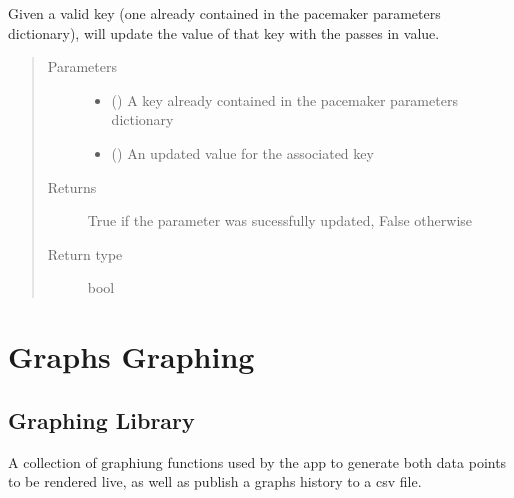 \documentclass[letterpaper,10pt,english]{sphinxmanual}
\begin{document}
\begin{fulllineitems}
\begin{fulllineitems}
Given a valid key (one already contained in the pacemaker parameters
dictionary), will update the value of that key with the passes in
value.
\begin{quote}\begin{description}
\item[{Parameters}] \leavevmode\begin{itemize}
\item {} 
 () \textendash{} A key already contained in the pacemaker parameters dictionary

\item {} 
 () \textendash{} An updated value for the associated key

\end{itemize}

\item[{Returns}] \leavevmode
True if the parameter was sucessfully updated, False otherwise

\item[{Return type}] \leavevmode
bool

\end{description}\end{quote}

\end{fulllineitems}


\end{fulllineitems}



\chapter{Graphs Graphing}
\label{\detokenize{index:module-graphs.graphing}}\label{\detokenize{index:graphs-graphing}}

\section{Graphing Library}
\label{\detokenize{index:graphing-library}}
A collection of graphiung functions
used by the app to generate both data
points to be rendered live, as well as
publish a graphs history to a csv file.
\end{document}
